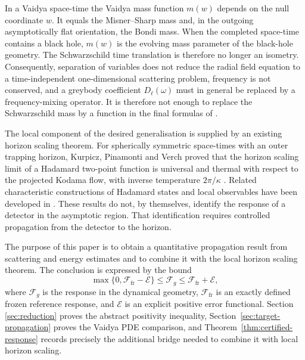 \documentclass[11pt,a4paper]{article}
\theoremstyle{definition}
\theoremstyle{remark}
\begin{document}
	In a Vaidya space-time the Vaidya mass function $m(w)$ depends on the null
	coordinate $w$.  It equals the Misner--Sharp mass and, in the outgoing
	asymptotically flat orientation, the Bondi mass.  When the completed
	space-time contains a black hole, $m(w)$ is the evolving mass parameter of
	the black-hole geometry.  The Schwarzschild time translation is therefore no
	longer an isometry.  Consequently, separation of variables
	does not reduce the radial field equation to a time-independent one-dimensional
	scattering problem, frequency is not conserved, and a greybody coefficient
	$D_\ell(\omega)$ must in general be replaced by a frequency-mixing operator.
	It is therefore not enough to replace the Schwarzschild mass by a function in
	the final formulas of \cite{FredenhagenHaag1990}.
	
	The local component of the desired generalisation is supplied by an existing
	horizon scaling theorem.
	For spherically symmetric space-times with an outer trapping horizon,
	Kurpicz, Pinamonti and Verch proved that the horizon scaling limit of a
	Hadamard two-point function is universal and thermal with respect to the
	projected Kodama flow, with inverse temperature $2\pi/\kappa$
	\cite{KurpiczPinamontiVerch2021}.  Related characteristic constructions of
	Hadamard states and local observables have been developed in
	\cite{JanssenVerch2023}.  These results do not, by themselves, identify the
	response of a detector in the asymptotic region.  That identification requires
	controlled propagation from the detector to the horizon.
	
	The purpose of this paper is to obtain a quantitative propagation result from
	scattering and energy estimates and to combine it with the local horizon
	scaling theorem.  The conclusion is expressed by the bound
	\begin{equation}
		\max\{0,\mathcal F_{\mathrm{fr}}-\mathcal E\}
		\leq \mathcal F_g
		\leq \mathcal F_{\mathrm{fr}}+\mathcal E,
		\label{eq:intro-bound}
	\end{equation}
	where $\mathcal F_g$ is the response in the dynamical geometry,
	$\mathcal F_{\mathrm{fr}}$ is an exactly defined frozen reference response,
	and $\mathcal E$ is an explicit positive error functional.  Section
	\ref{sec:reduction} proves the abstract positivity inequality,
	Section~\ref{sec:target-propagation} proves the Vaidya PDE comparison, and
	Theorem~\ref{thm:certified-response} records precisely the additional bridge
	needed to combine it with local horizon scaling.
	
\end{document}
